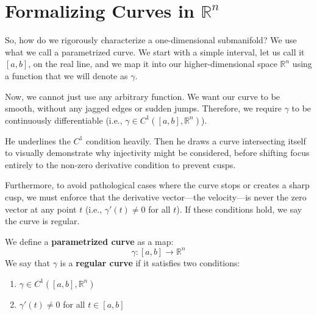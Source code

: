
\section{Formalizing Curves in \texorpdfstring{$\mathbb{R}^n$}{Rn}}    

\begin{spokenclean}[00:04:20 - 00:05:18]
So, how do we rigorously characterize a one-dimensional submanifold? We use what we call a parametrized curve. We start with a simple interval, let us call it $[a, b]$, on the real line, and we map it into our higher-dimensional space $\mathbb{R}^n$ using a function that we will denote as $\gamma$. 

Now, we cannot just use any arbitrary function. We want our curve to be smooth, without any jagged edges or sudden jumps. Therefore, we require $\gamma$ to be continuously differentiable (i.e., $\gamma \in C^1([a, b], \mathbb{R}^n)$).
\end{spokenclean}

\begin{nicebox}
He underlines the $C^1$ condition heavily. Then he draws a curve intersecting itself to visually demonstrate why injectivity might be considered, before shifting focus entirely to the non-zero derivative condition to prevent cusps.
\end{nicebox}

\begin{spokenclean}[00:05:18 - 00:06:10]
Furthermore, to avoid pathological cases where the curve stops or creates a sharp cusp, we must enforce that the derivative vector—the velocity—is never the zero vector at any point $t$ (i.e., $\gamma'(t) \neq 0$ for all $t$). If these conditions hold, we say the curve is regular.
\end{spokenclean}

\begin{mathstroke}
We define a \textbf{parametrized curve} as a map:
\[
\gamma: [a, b] \to \mathbb{R}^n
\]
We say that $\gamma$ is a \textbf{regular curve} if it satisfies two conditions:
\begin{enumerate}
    \item $\gamma \in C^1([a, b], \mathbb{R}^n)$ 
    \item $\gamma'(t) \neq 0$ for all $t \in [a, b]$ 
\end{enumerate}
\end{mathstroke}

